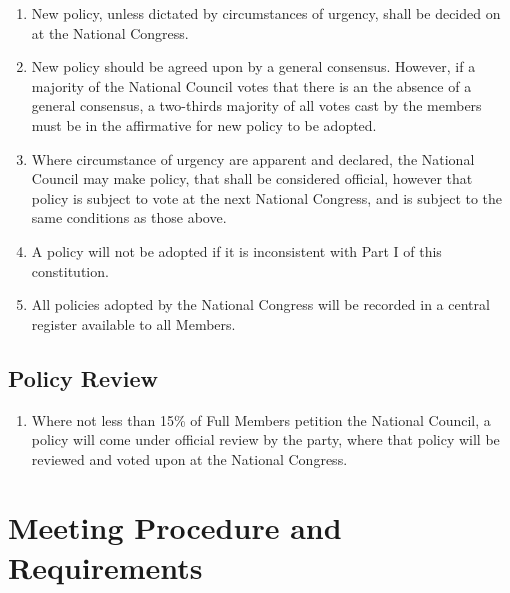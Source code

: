 \documentclass[a4paper,titlepage,8.5pt]{article}
\begin{document}
\begin{enumerate}
\item New policy, unless dictated by circumstances of urgency, shall be decided on at the National Congress.
\item New policy should be agreed upon by a general consensus. However, if a majority of the National Council votes that there is an the absence of a general consensus, a two-thirds majority of all votes cast by the members must be in the affirmative for new policy to be adopted. 
\item Where circumstance of urgency are apparent and declared, the National Council may make policy, that shall be considered official, however that policy is subject to vote at the next National Congress, and is subject to the same conditions as those above. 
\item A policy will not be adopted if it is inconsistent with Part I of this constitution.
\item All policies adopted by the National Congress will be recorded in a central register available to all Members.
\end{enumerate}

\subsection{Policy Review}

\begin{enumerate}
\item Where not less than 15\% of Full Members petition the National Council, a policy will come under official review by the party, where that policy will be reviewed and voted upon at the National Congress.
\end{enumerate}

\section{Meeting Procedure and Requirements}
\end{document}
